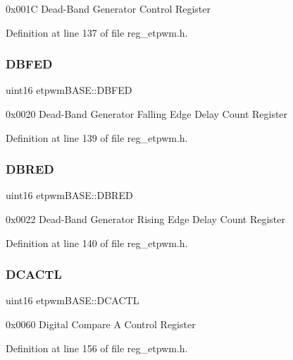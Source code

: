 0x001C Dead-\/\+Band Generator Control Register 

Definition at line 137 of file reg\+\_\+etpwm.\+h.

\mbox{\label{structetpwmBASE_a1cb4824c4ddeb01beac900891e1bc3d5}} 
\subsubsection{\texorpdfstring{D\+B\+F\+ED}{DBFED}}
{\footnotesize\ttfamily uint16 etpwm\+B\+A\+S\+E\+::\+D\+B\+F\+ED}

0x0020 Dead-\/\+Band Generator Falling Edge Delay Count Register 

Definition at line 139 of file reg\+\_\+etpwm.\+h.

\mbox{\label{structetpwmBASE_acfae7c758e612ee6b614328a48c34fc8}} 
\subsubsection{\texorpdfstring{D\+B\+R\+ED}{DBRED}}
{\footnotesize\ttfamily uint16 etpwm\+B\+A\+S\+E\+::\+D\+B\+R\+ED}

0x0022 Dead-\/\+Band Generator Rising Edge Delay Count Register 

Definition at line 140 of file reg\+\_\+etpwm.\+h.

\mbox{\label{structetpwmBASE_a99a9d823297a439d3794870aabec3f84}} 
\subsubsection{\texorpdfstring{D\+C\+A\+C\+TL}{DCACTL}}
{\footnotesize\ttfamily uint16 etpwm\+B\+A\+S\+E\+::\+D\+C\+A\+C\+TL}

0x0060 Digital Compare A Control Register 

Definition at line 156 of file reg\+\_\+etpwm.\+h.

\mbox{\label{structetpwmBASE_ad52e60bb14aad413a988aaea1930af53}} 
